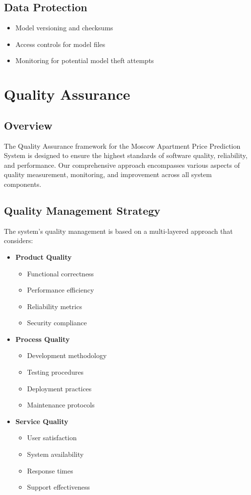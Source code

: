 \documentclass[12pt,a4paper]{report}
\begin{document}
\subsection{Data Protection}
\begin{itemize}
    \item Model versioning and checksums
    \item Access controls for model files
    \item Monitoring for potential model theft attempts
\end{itemize}

\section{Quality Assurance}
\subsection{Overview}
The Quality Assurance framework for the Moscow Apartment Price Prediction System is designed to ensure the highest standards of software quality, reliability, and performance. Our comprehensive approach encompasses various aspects of quality measurement, monitoring, and improvement across all system components.

\subsection{Quality Management Strategy}
The system's quality management is based on a multi-layered approach that considers:
\begin{itemize}
    \item \textbf{Product Quality}
    \begin{itemize}
        \item Functional correctness
        \item Performance efficiency
        \item Reliability metrics
        \item Security compliance
    \end{itemize}
    
    \item \textbf{Process Quality}
    \begin{itemize}
        \item Development methodology
        \item Testing procedures
        \item Deployment practices
        \item Maintenance protocols
    \end{itemize}
    
    \item \textbf{Service Quality}
    \begin{itemize}
        \item User satisfaction
        \item System availability
        \item Response times
        \item Support effectiveness
    \end{itemize}
\end{itemize}
\end{document}
